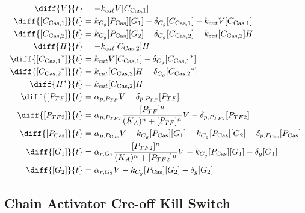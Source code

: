 \begin{align}
\diff{\vectorGen{}}{t} & = - \casCutRate{{}}\vectorGen{}\conc{\cplx{\cas}{1}}\\
\diff{\conc{\cplx{\cas}{1}}}{t} & =  \gRnaBind{}\conc{\proSp{\cas{}}}\conc{\gRna{1}} - \casCompDegradeRate{}\conc{\cplx{\cas}{1}} - \casCutRate{{}}\vectorGen{}\conc{\cplx{\cas}{1}}\\
\diff{\conc{\cplx{\cas}{2}}}{t} & =  \gRnaBind{}\conc{\proSp{\cas{}}}\conc{\gRna{2}} - \casCompDegradeRate{}\conc{\cplx{\cas}{2}} - \casCutRate{{}}\conc{\cplx{\cas}{2}}\hostGen{}\\
\diff{\hostGen{}}{t} & = - \casCutRate{{}}\conc{\cplx{\cas}{2}}\hostGen{}\\
\diff{\conc{\bound{\cplx{\cas}{1}}}}{t} & =  \casCutRate{{}}\vectorGen{}\conc{\cplx{\cas}{1}} - \casCompDegradeRate{}\conc{\bound{\cplx{\cas}{1}}}\\
\diff{\conc{\bound{\cplx{\cas}{2}}}}{t} & =  \casCutRate{{}}\conc{\cplx{\cas}{2}}\hostGen{} - \casCompDegradeRate{}\conc{\bound{\cplx{\cas}{2}}}\\
\diff{\edited{\hostGen{}}}{t} & =  \casCutRate{{}}\conc{\cplx{\cas}{2}}\hostGen{}\\
\diff{\conc{\proSp{TF}}}{t} & =  \txtlRate{\proSp{TF}}\vectorGen{} - \proDegradeRate{\proSp{TF}}\conc{\proSp{TF}}\\
\diff{\conc{\proSp{TF2}}}{t} & =  \txtlRate{\proSp{TF2}}\frac{\conc{\proSp{TF}}^n}{(K_A)^n + \conc{\proSp{TF}}^n}\vectorGen{} - \proDegradeRate{\proSp{TF2}}\conc{\proSp{TF2}}\\
\diff{\conc{\proSp{\cas{}}}}{t} & =  \txtlRate{\proSp{\cas{}}}\vectorGen{} - \gRnaBind{}\conc{\proSp{\cas{}}}\conc{\gRna{1}} - \gRnaBind{}\conc{\proSp{\cas{}}}\conc{\gRna{2}} - \proDegradeRate{\proSp{\cas{}}}\conc{\proSp{\cas{}}}\\
\diff{\conc{\gRna{1}}}{t} & =  \txRate{\gRna{1}}\frac{\conc{\proSp{TF2}}^n}{(K_A)^n + \conc{\proSp{TF2}}^n}\vectorGen{} - \gRnaBind{}\conc{\proSp{\cas{}}}\conc{\gRna{1}} - \rnaDegradeRate{}\conc{\gRna{1}}\\
\diff{\conc{\gRna{2}}}{t} & =  \txRate{\gRna{2}}\vectorGen{} - \gRnaBind{}\conc{\proSp{\cas{}}}\conc{\gRna{2}} - \rnaDegradeRate{}\conc{\gRna{2}}
\end{align}

\subsection{Chain Activator Cre-off Kill Switch}
\label{s:Chain_Activator_Cre_off_Kill_Switch}

